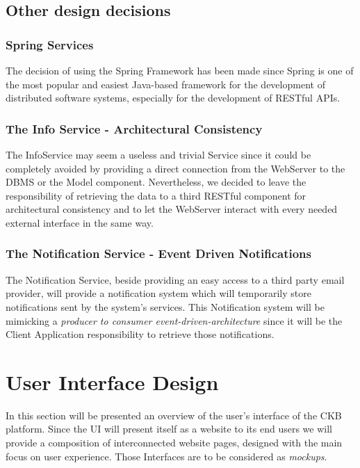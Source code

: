 \documentclass[11pt]{report}
\begin{document}
\section{Other design decisions} \label{sec:design_decisions}

\subsection{Spring Services} 
The decision of using the Spring Framework has been made since Spring is one of the most popular and easiest Java-based framework for the development of
distributed software systems, especially for the development of RESTful APIs.

\subsection{The Info Service - Architectural Consistency}
The InfoService may seem a useless and trivial Service since it could be completely avoided by providing a direct connection from the WebServer to the DBMS or the Model component.
Nevertheless, we decided to leave the responsibility of retrieving the data to a third RESTful component for architectural consistency and to let the WebServer interact with every needed external interface in the same way.

\subsection{The Notification Service - Event Driven Notifications} \label{sec:the_notificationservice_eventdrivennotifications}
The Notification Service, beside providing an easy access to a third party email provider, will provide a notification system which will temporarily store notifications sent by the system's services.
This Notification system will be mimicking a \emph{producer to consumer event-driven-architecture} since it will be the Client Application responsibility to retrieve those notifications.

\def\UIwidth{1}

\chapter{User Interface Design}
In this section will be presented an overview of the user's interface of the CKB platform.
Since the UI will present itself as a website to its end users we will provide a composition of interconnected website pages, designed with the main focus on user experience.
Those Interfaces are to be considered as \emph{mockups}.
\end{document}
